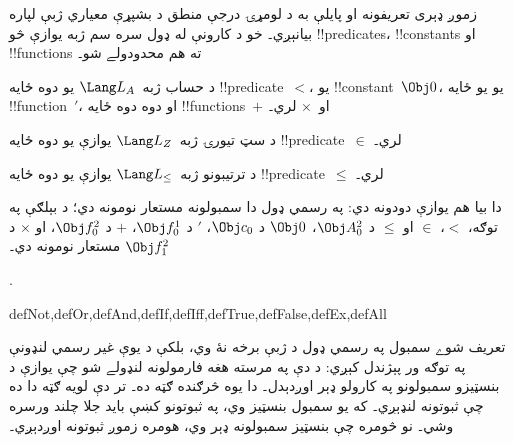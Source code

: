 \documentclass[../../../include/open-logic-section]{subfiles}
\begin{document}
زموږ ډېری تعريفونه او پايلې به د لومړۍ درجې منطق د بشپړې معياري ژبې
لپاره بيانېږي۔ خو د کارونې له ډول سره سم ژبه يوازې څو !!{predicate}s،
!!{constant}s او !!{function}s ته هم محدودولے شو۔

\begin{ex}
د حساب ژبه~$\Lang L_A$ يو دوه ځايه !!{predicate}~$<$، يو
!!{constant}~$\Obj 0$، يو يو ځايه !!{function}~$\prime$، او دوه دوه
ځايه !!{function}s~$+$ او~$\times$ لري۔
\end{ex}

\begin{ex}
د سټ تيورۍ ژبه~$\Lang L_Z$ يوازې يو دوه ځايه !!{predicate}~$\in$
لري۔
\end{ex}

\begin{ex}
د ترتيبونو ژبه~$\Lang L_\le$ يوازې يو دوه ځايه !!{predicate}~$\le$
لري۔
\end{ex}

دا بيا هم يوازې دودونه دي: په رسمي ډول دا سمبولونه مستعار نومونه دي؛
د بېلګې په توګه، $<$، $\in$ او $\le$ د $\Obj A^2_0$، $\Obj 0$ د
$\Obj c_0$، $\prime$ د $\Obj f^1_0$، $+$ د $\Obj f^2_0$، او $\times$ د
$\Obj f^2_1$ مستعار نومونه دي۔

.

\begin{tagblock}{defNot,defOr,defAnd,defIf,defIff,defTrue,defFalse,defEx,defAll}
\begin{explain}
تعريف شوے سمبول په رسمي ډول د ژبې برخه نۀ وي، بلکې د يوې غير رسمي
لنډونې په توګه ور پېژندل کېږي: د دې په مرسته هغه فارمولونه لنډولے شو
چې يوازې د بنسټيزو سمبولونو په کارولو ډېر اوږدېدل۔ دا يوه څرګنده ګټه
ده۔ تر دې لويه ګټه دا ده چې ثبوتونه لنډېږي۔ که يو سمبول بنسټيز وي، په
ثبوتونو کښې بايد جلا چلند ورسره وشي۔ نو څومره چې بنسټيز سمبولونه ډېر
وي، هومره زموږ ثبوتونه اوږدېږي۔
\end{explain}
\end{tagblock}
\end{document}
